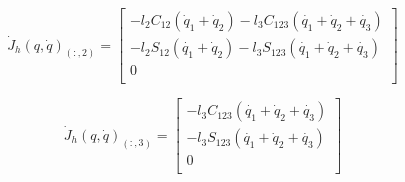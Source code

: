 \documentclass[12pt, a4paper]{article}
\begin{document}
\begin{equation}
    \dot{J}_h(q, \dot{q})_{(:, 2)} = 
    \begin{bmatrix}
     - l_2   C_{12} (\dot{q}_1 + \dot{q}_2) - l_3   C_{123} (\dot{q_1} + \dot{q}_2 + \dot{q_3})\\
     - l_2   S_{12} (\dot{q_1} + \dot{q}_2) - l_3   S_{123} (\dot{q_1} + \dot{q}_2 + \dot{q_3})\\
     0\\
    \end{bmatrix}
\end{equation}

\begin{equation}
    \dot{J}_h(q, \dot{q})_{(:, 3)} = 
    \begin{bmatrix}
    - l_3   C_{123} (\dot{q_1} + \dot{q}_2 + \dot{q_3})\\
    - l_3   S_{123} (\dot{q_1} + \dot{q}_2 + \dot{q_3}) \\
    0\\
    \end{bmatrix}
\end{equation}

\end{document}
